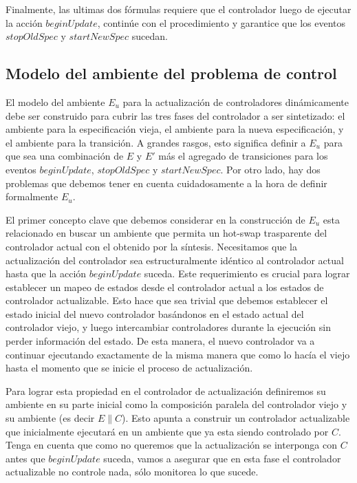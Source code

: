 Finalmente, las ultimas dos fórmulas requiere que el controlador luego de ejecutar la acción $beginUpdate$, continúe con
el procedimiento y garantice que los eventos $stopOldSpec$ y $startNewSpec$ sucedan.

\subsection{Modelo del ambiente del problema de control}

El modelo del ambiente $E_u$ para la actualización de controladores dinámicamente debe ser construido para cubrir las
tres fases del controlador a ser sintetizado: el ambiente para la especificación vieja, el ambiente para la nueva
especificación, y el ambiente para la transición. A grandes rasgos, esto significa definir a $E_u$ para que sea una
combinación de $E$ y $E'$ más el agregado de transiciones para los eventos $beginUpdate$, $stopOldSpec$ y
$startNewSpec$. Por otro lado, hay dos problemas que debemos tener en cuenta cuidadosamente a la hora de definir
formalmente $E_u$.

El primer concepto clave que debemos considerar en la construcción de $E_u$ esta relacionado en buscar un ambiente que
permita un hot-swap trasparente del controlador actual con el obtenido por la síntesis. Necesitamos que la actualización
del controlador sea estructuralmente idéntico al controlador actual hasta que la acción $beginUpdate$ suceda. Este
requerimiento es crucial para lograr establecer un mapeo de estados desde el controlador actual a los estados de controlador
actualizable. Esto hace que sea trivial que debemos establecer el estado inicial del nuevo controlador basándonos en el
estado actual del controlador viejo, y luego intercambiar controladores durante la ejecución sin perder información del
estado. De esta manera, el nuevo controlador va a continuar ejecutando exactamente de la misma manera que como lo hacía
el viejo hasta el momento que se inicie el proceso de actualización.

Para lograr esta propiedad en el controlador de actualización definiremos su ambiente en su parte inicial como la
composición paralela del controlador viejo y su ambiente (es decir $E\|C$). Esto apunta a construir un controlador
actualizable que inicialmente ejecutará en un ambiente que ya esta siendo controlado por $C$. Tenga en cuenta que como
no queremos que la actualización se interponga con $C$ antes que $beginUpdate$ suceda, vamos a asegurar que en esta fase
el controlador actualizable no controle nada, sólo monitorea lo que sucede.

